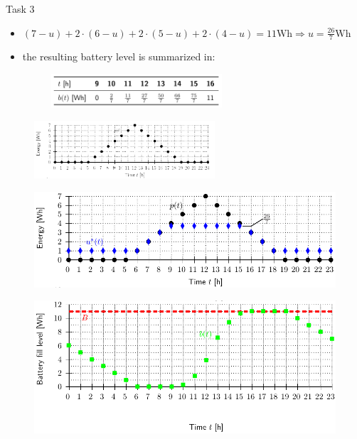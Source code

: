 \begin{frame}[allowframebreaks]{Task 3}{}
\begin{solutionnoinc}
\begin{itemize}
      \begin{itemize}
        \item $(7-u)+2 \cdot(6-u)+2 \cdot(5-u)+2 \cdot(4-u)=11 \mathrm{Wh} \Rightarrow u=\frac{26}{7} \mathrm{Wh}$
        \item the resulting battery level is summarized in:
        \begin{figure}
          \centering
          \includegraphics[width=0.6\textwidth]{./figures/task3_table.png}
        \end{figure}
      \end{itemize}
    \end{itemize}
  \end{solutionnoinc}
  \framebreak
  \begin{solutionnoinc}
    \begin{figure}
      \centering
      \includegraphics[width=0.6\textwidth]{./figures/energyUsage_1_empty.png}
    \end{figure}
  \end{solutionnoinc}
  \begin{solutionnoinc}
    \begin{figure}
      \centering
      \includegraphics[width=\textwidth]{./figures/task3_use_and_harvest.png}
    \end{figure}
  \end{solutionnoinc}
  \begin{solution}
    \begin{figure}
      \centering
      \includegraphics[width=\textwidth]{./figures/task3_battery.png}

\end{figure}
\end{solution}
\end{frame}
